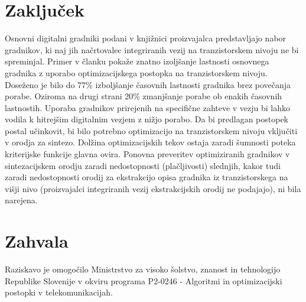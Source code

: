 \documentclass[journal,a4paper,twoside]{sty/IEEEtran}
\begin{document}
\section{Zaključek}
Osnovni digitalni gradniki podani v knjižnici proizvajalca predstavljajo nabor gradnikov, ki naj jih načrtovalec integriranih vezij na tranzistorskem nivoju ne bi spreminjal. Primer v članku pokaže znatno izoljšanje lastnosti osnovnega gradnika z uporabo optimizacijskega postopka na tranzistorskem nivoju. Doseženo je bilo do 77\% izboljšanje časovnih lastnosti gradnika brez povečanja porabe. Oziroma na drugi strani 20\% zmanjšanje porabe ob enakih časovnih lastnostih. Uporaba gradnikov prirejenih na specifične zahteve v vezju bi lahko vodila k hitrejšim digitalnim vezjem z nižjo porabo. Da bi predlagan postopek postal učinkovit, bi bilo potrebno optimizacijo na tranzistorskem nivoju vključiti v orodja za sintezo. Dolžina optimizacijskih tekov ostaja zaradi šumnosti poteka kriterijske funkcije glavna ovira. Ponovna preveritev optimiziranih gradnikov v sintezacijskem orodju zaradi nedostopnosti (plačljivosti) slednjih, kakor tudi zaradi nedostopnosti orodij za ekstrakcijo opisa gradnika iz tranzistorskega na višji nivo (proizvajalci integriranih vezij ekstrakcijskih orodij ne podajajo), ni bila narejena.

\section*{Zahvala}
Raziskavo je omogočilo Ministrstvo za visoko šolstvo, znanost in tehnologijo Republike Slovenije v okviru programa P2-0246 - Algoritmi in optimizacijski postopki v telekomunikacijah.
\end{document}

